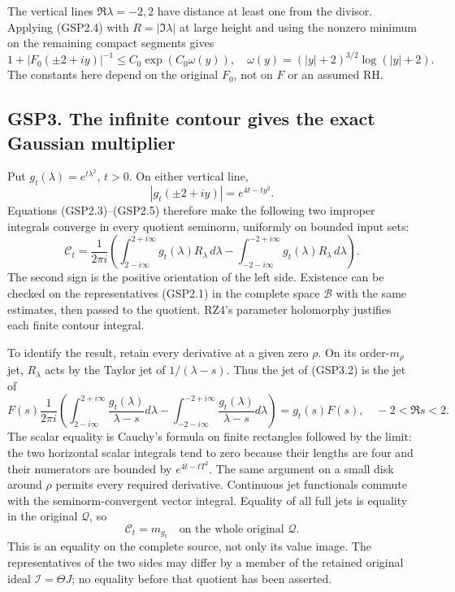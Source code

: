 The vertical lines \(\Re\lambda=-2,2\) have distance at least one from
the divisor. Applying (GSP2.4) with \(R=|\Im\lambda|\) at large height
and using the nonzero minimum on the remaining compact segments gives \[
1+|F_0(\pm2+iy)|^{-1}\le C_0\exp(C_0\omega(y)),
\quad \omega(y)=(|y|+2)^{3/2}\log(|y|+2).
\tag{GSP2.5}
\] The constants here depend on the original \(F_0\), not on \(F\) or an
assumed RH.

\subsection{GSP3. The infinite contour gives the exact Gaussian
multiplier}\label{gsp3.-the-infinite-contour-gives-the-exact-gaussian-multiplier}

Put \(g_t(\lambda)=e^{t\lambda^2}\), \(t>0\). On either vertical line,
\[
|g_t(\pm2+iy)|=e^{4t-ty^2}.
\tag{GSP3.1}
\] Equations (GSP2.3)--(GSP2.5) therefore make the following two
improper integrals converge in every quotient seminorm, uniformly on
bounded input sets: \[
\mathcal C_t=
\frac1{2\pi i}\left(
\int_{2-i\infty}^{2+i\infty}g_t(\lambda)R_\lambda\,d\lambda
-\int_{-2-i\infty}^{-2+i\infty}g_t(\lambda)R_\lambda\,d\lambda
\right).
\tag{GSP3.2}
\] The second sign is the positive orientation of the left side.
Existence can be checked on the representatives (GSP2.1) in the complete
space \(\mathcal B\) with the same estimates, then passed to the
quotient. RZ4's parameter holomorphy justifies each finite contour
integral.

To identify the result, retain every derivative at a given zero
\(\rho\). On its order-\(m_\rho\) jet, \(R_\lambda\) acts by the Taylor
jet of \(1/(\lambda-s)\). Thus the jet of (GSP3.2) is the jet of \[
F(s)\frac1{2\pi i}\left(
\int_{2-i\infty}^{2+i\infty}\frac{g_t(\lambda)}{\lambda-s}d\lambda
-\int_{-2-i\infty}^{-2+i\infty}\frac{g_t(\lambda)}{\lambda-s}d\lambda
\right)
=g_t(s)F(s),\quad -2<\Re s<2.
\tag{GSP3.3}
\] The scalar equality is Cauchy's formula on finite rectangles followed
by the limit: the two horizontal scalar integrals tend to zero because
their lengths are four and their numerators are bounded by
\(e^{4t-tT^2}\). The same argument on a small disk around \(\rho\)
permits every required derivative. Continuous jet functionals commute
with the seminorm-convergent vector integral. Equality of all full jets
is equality in the original \(\mathcal Q\), so \[
\boxed{\mathcal C_t=m_{g_t}\quad\text{on the whole original }\mathcal Q.}
\tag{GSP3.4}
\] This is an equality on the complete source, not only its value image.
The representatives of the two sides may differ by a member of the
retained original ideal \(\mathcal I=\Theta J\); no equality before that
quotient has been asserted.

